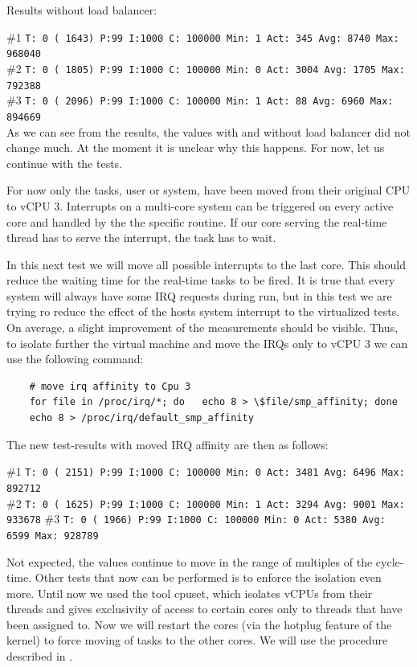 \documentclass[]{scrartcl}
\begin{document}
\noindent Results without load balancer:

\noindent \small \#1 \texttt{T: 0 ( 1643) P:99 I:1000 C: 100000 Min: 1 Act:  345 Avg: 8740 Max:  968040}\\
\noindent \small \#2 \texttt{T: 0 ( 1805) P:99 I:1000 C: 100000 Min: 0 Act: 3004 Avg: 1705 Max:  792388}\\
\noindent \small \#3 \texttt{T: 0 ( 2096) P:99 I:1000 C: 100000 Min: 1 Act:   88 Avg: 6960 Max:  894669}\\

As we can see from the results, the values with and without load balancer did not change much.
At the moment it is unclear why this happens. For now, let us continue with the tests.

For now only the tasks, user or system, have been moved from their original CPU to vCPU 3. 
Interrupts on a multi-core system can be triggered on every active core and handled by the the specific routine. If our core serving the real-time thread has to serve the interrupt, the task has to wait.

In this next test we will move all possible interrupts to the last core. This should reduce the waiting time for the real-time tasks to be fired.
It is true that every system will always have some IRQ requests during run, but in this test we are trying ro reduce the effect of the hosts system interrupt to the virtualized tests.
On average, a slight improvement of the measurements should be visible.
Thus, to isolate further the virtual machine and move the IRQs only to vCPU 3 we can use the following command: 

\begin{verbatim}
	# move irq affinity to Cpu 3
	for file in /proc/irq/*; do   echo 8 > \$file/smp_affinity; done
	echo 8 > /proc/irq/default_smp_affinity
\end{verbatim}

\noindent The new test-results with moved IRQ affinity are then as follows:
 
\noindent \small \#1 \texttt{T: 0 ( 2151) P:99 I:1000 C: 100000 Min: 0 Act: 3481 Avg: 6496 Max:  892712}\\
\noindent \small \#2 \texttt{T: 0 ( 1625) P:99 I:1000 C: 100000 Min: 1 Act: 3294 Avg: 9001 Max:  933678}
\noindent \small \#3 \texttt{T: 0 ( 1966) P:99 I:1000 C: 100000 Min: 0 Act: 5380 Avg: 6599 Max:  928789}

Not expected, the values continue to move in the range of multiples of the cycle-time. Other tests that now can be performed is to enforce the isolation even more. Until now we used the tool cpuset, which isolates vCPUs from their threads and gives exclusivity of access to certain cores only to threads that have been assigned to.
Now we will restart the cores (via the hotplug feature of the kernel) to force moving of tasks to the other cores. We will use the procedure described in \cite{lrt02}.
\end{document}
